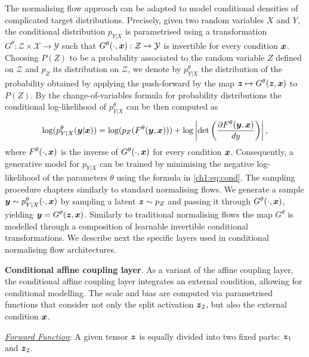 The normalising flow approach can be adapted to model conditional densities of complicated target distributions. Precisely, given two random variables $X$ and $Y$, the conditional distribution $p_{Y|X}$ is parametrised using a transformation $G^\theta : \mathcal{Z} \times \mathcal{X} \rightarrow \mathcal{Y}$ such that $G^\theta(\cdot, \boldsymbol{x}) : \mathcal{Z} \rightarrow \mathcal{Y}$ is invertible for every condition $\boldsymbol{x}$. Choosing $P(Z)$ to be a probability associated to the random variable $Z$ defined on $\mathcal{Z}$ and $p_Z$ its distribution on $\mathcal{Z}$, we denote by $p^\theta_{Y|X}$ the distribution of the probability obtained by applying the push-forward by the map $ \boldsymbol{z} \mapsto G^\theta(\boldsymbol{z}, \boldsymbol{x})$ to $P(Z)$. By the change-of-variables formula for probability distributions the conditional log-likelihood of $p^\theta_{Y|X}$ can be then computed as 
\begin{align}\label{ch1:eq:cond}
\log(p^\theta_{Y|X}(\boldsymbol{y}|\boldsymbol{x})) = \log(p_{Z}(F^\theta(\boldsymbol{y},\boldsymbol{x})))   +  \log\left| \det \left(\frac{\partial F^{\theta}(\boldsymbol{y},\boldsymbol{x})}{dy} \right)\right|,
\end{align}
where $F^\theta(\cdot, \boldsymbol{x})$ is the inverse of $G^\theta(\cdot, \boldsymbol{x})$ for every condition $\boldsymbol{x}$.
Consequently, a generative model for $p_{Y|X}$ can be trained by minimising the negative log-likelihood of the parameters $\theta$ using the formula in \eqref{ch1:eq:cond}. The sampling procedure chapters similarly to standard normalising flows. We generate a sample $\boldsymbol{y} \sim p^\theta_{Y|X}(\cdot, \boldsymbol{x})$ by sampling a latent $\boldsymbol{z}\sim p_Z$ and passing it through $G^\theta(\cdot, \boldsymbol{x})$, yielding $\boldsymbol{y}=G^\theta(\boldsymbol{z}, \boldsymbol{x})$. Similarly to traditional normalising flows the map $G^\theta$ is modelled through a composition of learnable invertible conditional transformations. We describe next the specific layers used in conditional normalising flow architectures.

\medskip

\textbf{Conditional affine coupling layer}. As a variant of the affine coupling layer, the conditional affine coupling layer integrates an external condition, allowing for conditional modelling. The scale and bias are computed via parametrised functions that consider not only the split activation \(\boldsymbol{z}_2\), but also the external condition \(\boldsymbol{x}\). 

\smallskip



\textit{\underline{Forward Function}}:
A given tensor \(\boldsymbol{z}\) is equally divided into two fixed parts: \(\boldsymbol{z}_1\) and \(\boldsymbol{z}_2\). 


